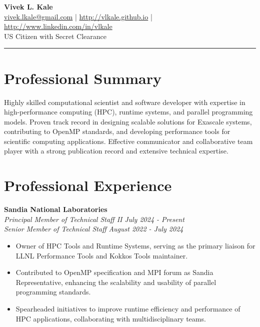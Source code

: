 \documentclass[11pt]{article}
\begin{document}
\begin{center}
    \Large \textbf{Vivek L. Kale} \\
    \normalsize
    \vspace{0.2cm}
    \href{mailto:vivek.lkale@gmail.com}{vivek.lkale@gmail.com} | 
    \href{http://vlkale.github.io}{http://vlkale.github.io} | 
    \href{http://www.linkedin.com/in/vlkale}{http://www.linkedin.com/in/vlkale}\\
    US Citizen with Secret Clearance
\end{center}

\vspace{0.5cm}
\noindent\rule{\linewidth}{0.4pt}
 \selectfont
\section*{Professional Summary}
Highly skilled computational scientist and software developer with expertise in high-performance computing (HPC), runtime systems, and parallel programming models. Proven track record in designing scalable solutions for Exascale systems, contributing to OpenMP standards, and developing performance tools for scientific computing applications. Effective communicator and collaborative team player with a strong publication record and extensive technical expertise.

\section*{Professional Experience}

\textbf{Sandia National Laboratories}\\
\textit{Principal Member of Technical Staff II} \hfill \textit{July 2024 - Present}\\
\textit{Senior Member of Technical Staff} \hfill \textit{August 2022 - July 2024}
\begin{itemize}[noitemsep,topsep=0pt]
\item Owner of HPC Tools and Runtime Systems, serving as the primary liaison for LLNL Performance Tools and Kokkos Tools maintainer.
\item Contributed to OpenMP specification and MPI forum as Sandia Representative, enhancing the scalability and usability of parallel programming standards.
\item Spearheaded initiatives to improve runtime efficiency and performance of HPC applications, collaborating with multidisciplinary teams.
\end{itemize}
\end{document}
